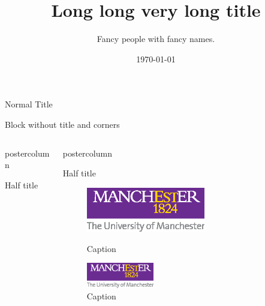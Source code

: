 \documentclass{beamer}
\title{Long long very long title}
\author{Fancy people with fancy names.}
\institute{Fancy institutions with fancy names.}
\date{\today}
\begin{document}
\begin{frame}
	
\vspace{0.8ex}
	
\begin{UoMblock}{Normal Title}
\blindmathtrue \Blindtext[1][5]
\end{UoMblock}

\vspace{0.8ex}
\begin{UoMblock}[colframe=white,no shadow]{}
	Block without title and corners
\end{UoMblock}	
\vspace{1.0ex}

\begin{columns}[t]
	\begin{column}{.47\textwidth}
		\begin{beamercolorbox}[center,wd=\textwidth]{postercolumn}
			\begin{UoMblock}[equal height group=A]{Half title}
				\Blindtext[1][10]
			\end{UoMblock}\vfill
	\end{beamercolorbox}
	\end{column}
	\hspace{0.05em}
	\begin{column}{.47\textwidth}
		\begin{beamercolorbox}[center,wd=\textwidth]{postercolumn}
			\begin{UoMblock}[equal height group=A]{Half title}
				\Blindtext[1][10]
				\begin{figure}
					\begin{minipage}{0.43\textwidth}
						\centering\includegraphics[width=0.6\textwidth]{uom}
						\caption{Caption}
					\end{minipage}
					\begin{minipage}{0.03\textwidth}
					\end{minipage}
					\begin{minipage}{0.45\textwidth}
						\centering\includegraphics[width=0.34\textwidth]{uom}
						\caption{Caption}
					\end{minipage}
				\end{figure}
			\end{UoMblock}
		\end{beamercolorbox}
	\end{column}
\end{columns}


\end{frame}
\end{document}
